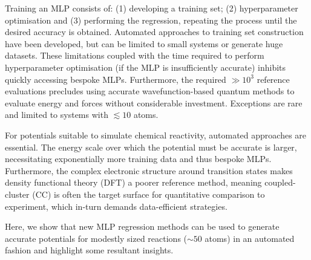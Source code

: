 \documentclass[twoside,twocolumn,9pt]{article}
\begin{document}
Training an MLP consists of: (1) developing a training set; (2) hyperparameter optimisation and (3) performing the regression, repeating the process until the desired accuracy is obtained. Automated approaches to training set construction have been developed,\cite{Smith2018, Young2021gap, Miksch2021} but can be limited to small systems or generate huge datasets. These limitations coupled with the time required to perform hyperparameter optimisation (if the MLP is insufficiently accurate) inhibits quickly accessing bespoke MLPs. Furthermore, the required $\gg10^3$ reference evaluations precludes using accurate wavefunction-based quantum methods to evaluate energy and forces without considerable investment.\cite{Smith2019} Exceptions are rare and limited to systems with $\lesssim 10$ atoms.\cite{Young2021gap, Dral2020}

For potentials suitable to simulate chemical reactivity, automated approaches are essential. The energy scale over which the potential must be accurate is larger, necessitating exponentially more training data and thus bespoke MLPs. Furthermore, the complex electronic structure around transition states makes density functional theory (DFT) a poorer reference method,\cite{Zhao2005} meaning coupled-cluster (CC) is often the target surface for quantitative comparison to experiment, which in-turn demands data-efficient strategies.

Here, we show that new MLP regression methods\cite{Batzner2021, Kovacs2021} can be used to generate accurate potentials for modestly sized reactions ($\sim50$ atoms) in an automated fashion and highlight some resultant insights. 
\end{document}
